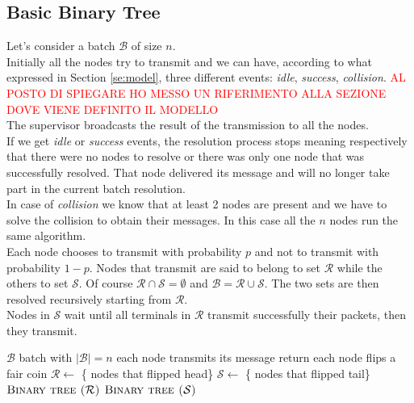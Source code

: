 \documentclass[12pt,a4paper]{report}
\newcommand{\rev}[1]{\textcolor{Cerulean}{#1}}
\newcommand{\algname}[1]{\ensuremath{\mbox{\sc #1}}}
\begin{document}
\subsection{Basic Binary Tree}
\label{basicbinarytreedescription}
Let's consider a batch $\mathcal{B}$ of size $n$.\\
\rev{Initially all the nodes try to transmit and we can have, according to what expressed in Section \ref{se:model}, three different events: \emph{idle}, \emph{success}, \emph{collision}.}\textcolor{red}{ AL POSTO DI SPIEGARE HO MESSO UN RIFERIMENTO ALLA SEZIONE DOVE VIENE DEFINITO IL MODELLO}\\
The supervisor broadcasts the result of the transmission to all the nodes.\\
If we get \emph{idle} or  \emph{success} events, the resolution process stops meaning respectively that there were no nodes to resolve or there was only one node that was successfully resolved. That node delivered its message and will no longer take part in the current batch resolution.\\
In case of \emph{collision} we know that at least 2 nodes are present and we have to solve the collision to obtain their messages. In this case all the $n$ nodes run the same algorithm.\\
Each node chooses to transmit with probability $p$ and not to transmit with probability $1-p$. Nodes that transmit  are said to belong to set $\mathcal{R}$ while the others to set $\mathcal{S}$. Of course $\mathcal{R}  \cap \mathcal{S} = \emptyset$ and $\mathcal{B} = \mathcal{R}  \cup \mathcal{S}$. The two sets are then resolved recursively starting from $\mathcal{R}$.\\
Nodes in $\mathcal{S}$ wait until all terminals in $\mathcal{R}$ transmit successfully their packets, then they transmit.\\

\begin{algorithm}[h!]
\caption{\algname{binary tree ($\mathcal{B}$)}}
\label{alg:binarytree}
\begin{algorithmic}
\STATE {}
\REQUIRE $\mathcal{B}$ batch with $|\mathcal{B}|=n$
\STATE each node transmits its message
	\STATE return
\ELSE
	\STATE each node flips a fair coin
	\STATE $\mathcal{R} \gets$ \{ nodes that flipped head\}
	\STATE $\mathcal{S} \gets$ \{ nodes that flipped tail\}
	\STATE \algname{Binary tree ($\mathcal{R}$)}
	\STATE \algname{Binary tree ($\mathcal{S}$)}
\ENDIF
\end{algorithmic}
\end{algorithm}
\end{document}
